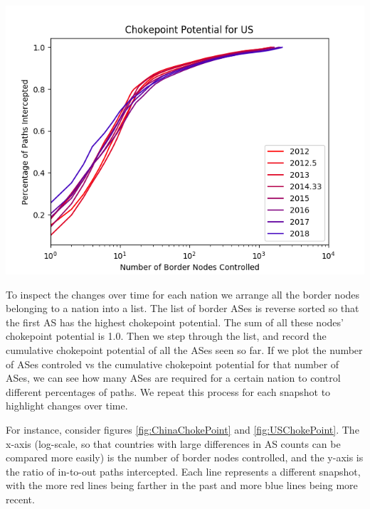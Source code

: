 \documentclass{article}
\newenvironment{Figure}
  {\par\medskip\noindent\minipage{\linewidth}}
  {\endminipage\par\medskip}
\begin{document}
\begin{multicols}{2}
\begin{Figure}
	\centering
	\includegraphics[width=\linewidth]{single_US}
	\label{fig:USChokePoint}
\end{Figure}

To inspect the changes over time for each nation we arrange all the border nodes belonging to a nation into a list. The list of border ASes is reverse sorted
so that the first AS has the highest chokepoint potential. The sum of all these nodes' chokepoint potential is 1.0. Then we step through the list, and record
the cumulative chokepoint potential of all the ASes seen so far. If we plot the number of ASes controled vs the cumulative chokepoint potential for that number
of ASes, we can see how many ASes are required for a certain nation to control different percentages of paths. We repeat this process for each snapshot to highlight
changes over time.

\par
For instance, consider figures \ref{fig:ChinaChokePoint} and \ref{fig:USChokePoint}. 
The x-axis (log-scale, so that countries with large differences in AS counts can be compared more easily)
is the number of border nodes controlled, and the y-axis is the ratio of in-to-out paths intercepted. Each line represents a different snapshot, with the more red lines being
farther in the past and more blue lines being more recent.


\end{multicols}
\end{document}
